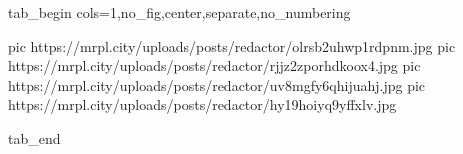  
 
 
 
 


\ifcmt
  tab_begin cols=1,no_fig,center,separate,no_numbering

     pic https://mrpl.city/uploads/posts/redactor/olrsb2uhwp1rdpnm.jpg
     pic https://mrpl.city/uploads/posts/redactor/rjjz2zporhdkoox4.jpg
     pic https://mrpl.city/uploads/posts/redactor/uv8mgfy6qhijuahj.jpg
     pic https://mrpl.city/uploads/posts/redactor/hy19hoiyq9yffxlv.jpg

  tab_end
\fi
